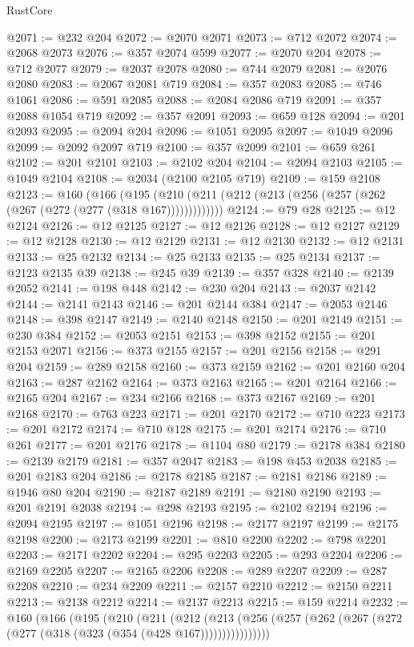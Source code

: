 \begin{lexlean}{RustCore}
\begin{coremodule}
@2071 := @232 @204
@2072 := @2070 @2071
@2073 := @712 @2072
@2074 := @2068 @2073
@2076 := @357 @2074 @599
@2077 := @2070 @204
@2078 := @712 @2077
@2079 := @2037 @2078
@2080 := @744 @2079
@2081 := @2076 @2080
@2083 := @2067 @2081 @719
@2084 := @357 @2083
@2085 := @746 @1061
@2086 := @591 @2085
@2088 := @2084 @2086 @719
@2091 := @357 @2088 @1054 @719
@2092 := @357 @2091
@2093 := @659 @128
@2094 := @201 @2093
@2095 := @2094 @204
@2096 := @1051 @2095
@2097 := @1049 @2096
@2099 := @2092 @2097 @719
@2100 := @357 @2099
@2101 := @659 @261
@2102 := @201 @2101
@2103 := @2102 @204
@2104 := @2094 @2103
@2105 := @1049 @2104
@2108 := @2034 (@2100 @2105 @719)
@2109 := @159 @2108
@2123 := @160
    (@166 (@195 (@210 (@211 (@212 (@213 (@256 (@257 (@262 (@267 (@272 (@277 (@318 @167)))))))))))))
@2124 := @79 @28
@2125 := @12 @2124
@2126 := @12 @2125
@2127 := @12 @2126
@2128 := @12 @2127
@2129 := @12 @2128
@2130 := @12 @2129
@2131 := @12 @2130
@2132 := @12 @2131
@2133 := @25 @2132
@2134 := @25 @2133
@2135 := @25 @2134
@2137 := @2123 @2135 @39
@2138 := @245 @39
@2139 := @357 @328
@2140 := @2139 @2052
@2141 := @198 @448
@2142 := @230 @204
@2143 := @2037 @2142
@2144 := @2141 @2143
@2146 := @201 @2144 @384
@2147 := @2053 @2146
@2148 := @398 @2147
@2149 := @2140 @2148
@2150 := @201 @2149
@2151 := @230 @384
@2152 := @2053 @2151
@2153 := @398 @2152
@2155 := @201 @2153 @2071
@2156 := @373 @2155
@2157 := @201 @2156
@2158 := @291 @204
@2159 := @289 @2158
@2160 := @373 @2159
@2162 := @201 @2160 @204
@2163 := @287 @2162
@2164 := @373 @2163
@2165 := @201 @2164
@2166 := @2165 @204
@2167 := @234 @2166
@2168 := @373 @2167
@2169 := @201 @2168
@2170 := @763 @223
@2171 := @201 @2170
@2172 := @710 @223
@2173 := @201 @2172
@2174 := @710 @128
@2175 := @201 @2174
@2176 := @710 @261
@2177 := @201 @2176
@2178 := @1104 @80
@2179 := @2178 @384
@2180 := @2139 @2179
@2181 := @357 @2047
@2183 := @198 @453 @2038
@2185 := @201 @2183 @204
@2186 := @2178 @2185
@2187 := @2181 @2186
@2189 := @1946 @80 @204
@2190 := @2187 @2189
@2191 := @2180 @2190
@2193 := @201 @2191 @2038
@2194 := @298 @2193
@2195 := @2102 @2194
@2196 := @2094 @2195
@2197 := @1051 @2196
@2198 := @2177 @2197
@2199 := @2175 @2198
@2200 := @2173 @2199
@2201 := @810 @2200
@2202 := @798 @2201
@2203 := @2171 @2202
@2204 := @295 @2203
@2205 := @293 @2204
@2206 := @2169 @2205
@2207 := @2165 @2206
@2208 := @289 @2207
@2209 := @287 @2208
@2210 := @234 @2209
@2211 := @2157 @2210
@2212 := @2150 @2211
@2213 := @2138 @2212
@2214 := @2137 @2213
@2215 := @159 @2214
@2232 := @160
    (@166
      (@195
        (@210
          (@211
            (@212
              (@213 (@256 (@257 (@262 (@267 (@272 (@277 (@318 (@323 (@354 (@428 @167))))))))))))))))

\end{coremodule}
\end{lexlean}
